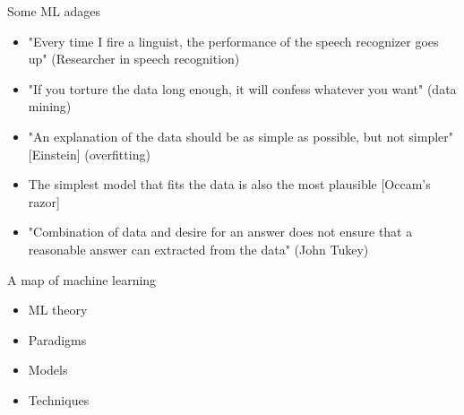 \documentclass[aspectratio=169, xcolor=dvipsnames]{beamer}
\begin{document}
  \begin{frame}{Some ML adages}
    \begin{itemize}
      \item "Every time I fire a linguist, the performance of the speech recognizer
        goes up" (Researcher in speech recognition)

      \item "If you torture the data long enough, it will confess whatever you want"
        (data mining)

      \item "An explanation of the data should be as simple as possible, but not
        simpler" [Einstein] (overfitting)

      \item The simplest model that fits the data is also the most plausible [Occam’s
        razor]

      \item "Combination of data and desire for an answer does not ensure that a
        reasonable answer can extracted from the data" (John Tukey)
    \end{itemize}
  \end{frame}

  \begin{frame}{A map of machine learning}
    \begin{itemize}
      \item ML theory

      \item Paradigms

      \item Models

      \item Techniques
    \end{itemize}
  \end{frame}
\end{document}

